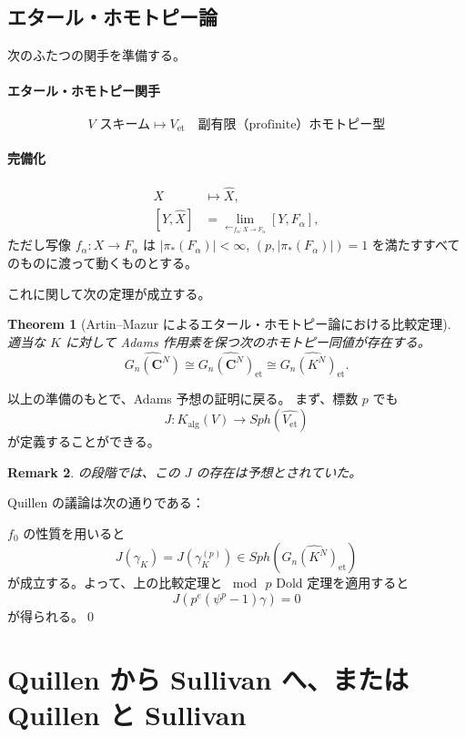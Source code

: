 \documentclass[uplatex,dvipdfmx,a4paper,12pt]{jlreq}
\newtheorem{theorem}{Theorem}
\newtheorem{remark}[theorem]{Remark}
\newcommand{\C}{\mathbf{C}}
\begin{document}
\subsection{エタール・ホモトピー論}

次のふたつの関手を準備する。

\paragraph{エタール・ホモトピー関手}
\[
  V \text{ スキーム} \mapsto V_{\mathrm{et}}
  \quad \text{副有限（profinite）ホモトピー型}
\]

\paragraph{完備化}
\begin{align*}
  X &\mapsto \hat{X}, \\
  [Y, \hat{X}] &= \lim_{\longleftarrow_{f_\alpha : X \to F_\alpha}} [Y, F_\alpha],
\end{align*}
ただし写像 $f_\alpha : X \to F_\alpha$ は
$|\pi_*(F_\alpha)| < \infty$, $(p, |\pi_*(F_\alpha)|) = 1$
を満たすすべてのものに渡って動くものとする。

これに関して次の定理が成立する。

\begin{theorem}[Artin--Mazur によるエタール・ホモトピー論における比較定理]
  適当な $K$ に対して Adams 作用素を保つ次のホモトピー同値が存在する。
  \[
    \widehat{G_n(\C^N)} \cong \widehat{G_n(\C^N)_{\mathrm{et}}}
    \cong \widehat{G_n(K^N)_{\mathrm{et}}}.
  \]
\end{theorem}

以上の準備のもとで、Adams 予想の証明に戻る。
まず、標数 $p$ でも
\[
  J : K_{\mathrm{alg}}(V) \longrightarrow \mathit{Sph}(\widehat{V_{\mathrm{et}}})
\]
が定義することができる。

\begin{remark}
  \cite{Q68} の段階では、この $J$ の存在は予想とされていた。
\end{remark}

Quillen の議論は次の通りである：

$f_0$ の性質を用いると
\[
  J(\gamma_K) = J(\gamma_K^{(p)}) \in \mathit{Sph}(\widehat{G_n(K^N)_{\mathrm{et}}})
\]
が成立する。よって、上の比較定理と $\bmod\, p$ Dold 定理を適用すると
\[
  J(p^e(\psi^p - 1)\gamma) = 0
\]
が得られる。\qed

\section{Quillen から Sullivan へ、または Quillen と Sullivan}
\end{document}
